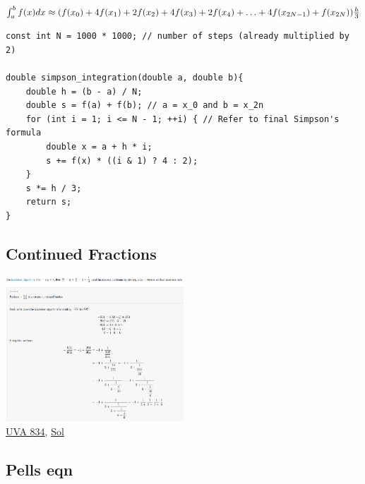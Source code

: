 \documentclass[8pt, a4paper, oneside, twocolumn]{extarticle}
\begin{document}
$\int_a ^ b f (x) dx \approx (f (x_0) + 4 f (x_1) + 2 f (x_2) + 4f(x_3) + 2 f(x_4)\\ + \ldots + 4 f(x_{2N-1}) + f(x_{2N}) )\frac {h} {3}$
\begin{verbatim}
const int N = 1000 * 1000; // number of steps (already multiplied by 2)

double simpson_integration(double a, double b){
    double h = (b - a) / N;
    double s = f(a) + f(b); // a = x_0 and b = x_2n
    for (int i = 1; i <= N - 1; ++i) { // Refer to final Simpson's formula
        double x = a + h * i;
        s += f(x) * ((i & 1) ? 4 : 2);
    }
    s *= h / 3;
    return s;
}
\end{verbatim}
\subsection{Continued Fractions}
\includegraphics[width=0.5\textwidth,height=0.5\textheight,keepaspectratio]{confr}
\\\href{https://uva.onlinejudge.org/external/8/834.pdf}{UVA 834}, \href{https://github.com/sourabh2311/Competitive-Programming/blob/master/UVA_834.cpp}{Sol}
\subsection{Pells eqn}
\end{document}
